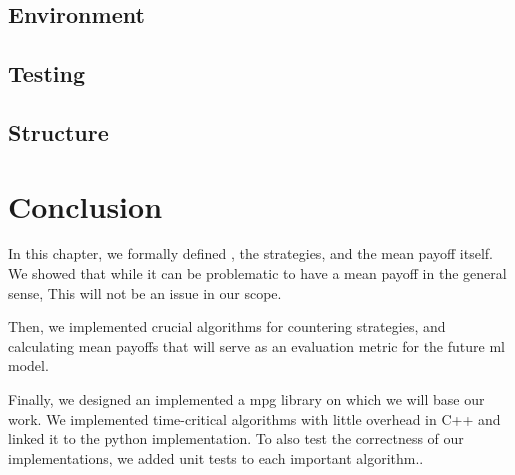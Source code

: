 \subsection{Environment}
\subsection{Testing}
\subsection{Structure}
\section*{Conclusion}
In this chapter, we formally defined , the strategies, and the mean payoff itself. We showed that while it can be problematic to have a mean payoff in the general sense, This will not be an issue in our scope.

Then, we implemented crucial algorithms for countering strategies, and calculating mean payoffs that will serve as an evaluation metric for the future \acrfull{ml} model. 

Finally, we designed an implemented a \acrshort{mpg} library on which we will base our work. We implemented time-critical algorithms with little overhead in C++ and linked it to the python implementation. To also test the correctness of our implementations, we added unit tests to each important algorithm..